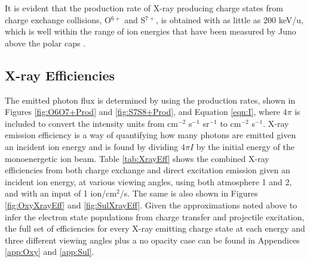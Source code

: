 \documentclass[draft]{agujournal2018}
\begin{document}
It is evident that the production rate of X-ray producing charge states from charge exchange collisions, O$^{6+}$ and S$^{7+}$, is obtained with as little as 200 keV/u, which is well within the range of ion energies that have been measured by Juno above the polar caps \citep{haggerty2017,clark2017a,clark2017b}.

\subsection{X-ray Efficiencies}

The emitted photon flux is determined by using the production rates, shown in Figures \ref{fig:O6O7+Prod} and \ref{fig:S7S8+Prod}, and Equation \ref{eqn:I}, where $4\pi$ is included to convert the intensity units from cm$^{-2}$ s$^{-1}$ sr$^{-1}$ to cm$^{-2}$ s$^{-1}$.
X-ray emission efficiency is a way of quantifying how many photons are emitted given an incident ion energy and is found by dividing $4\pi I$ by the initial energy of the monoenergetic ion beam.
Table \ref{tab:XrayEff} shows the combined X-ray efficiencies from both charge exchange and direct excitation emission given an incident ion energy, at various viewing angles, using both atmosphere 1 and 2, and with an input of 1 ion/cm$^2$/s.
The same is also shown in Figures \ref{fig:OxyXrayEff} and \ref{fig:SulXrayEff}.
Given the approximations noted above to infer the electron state populations from charge transfer and projectile excitation, the full set of efficiencies for every X-ray emitting charge state at each energy and three different viewing angles plus a no opacity case can be found in Appendices \ref{app:Oxy} and \ref{app:Sul}.
\end{document}
